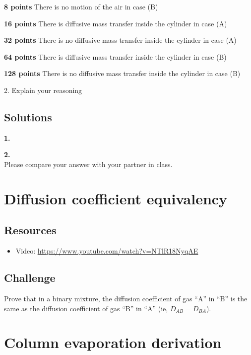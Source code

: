 \textbf{8 points} There is no motion of the air in case (B)

\textbf{16 points} There is diffusive mass transfer inside the cylinder in case (A)

\textbf{32 points} There is no diffusive mass transfer inside the cylinder in case (A)

\textbf{64 points} There is diffusive mass transfer inside the cylinder in case (B)

\textbf{128 points} There is no diffusive mass transfer inside the cylinder in case (B)

\vspace{1cm}
2. Explain your reasoning

\subsection*{Solutions}
\textbf{1.}\\

\textbf{2.}\\
Please compare your answer with your partner in class.




\newpage
\section{Diffusion coefficient equivalency}

\subsection*{Resources}
\begin{itemize}
    \item Video: \url{https://www.youtube.com/watch?v=NTlR18NyqAE}
\end{itemize}

\subsection*{Challenge}
Prove that in a binary mixture, the diffusion coefficient of gas ``A'' in ``B'' is the same as the diffusion coefficient of gas ``B'' in ``A'' (ie, $D_{AB} = D_{BA}$).




\newpage
\section{Column evaporation derivation}

